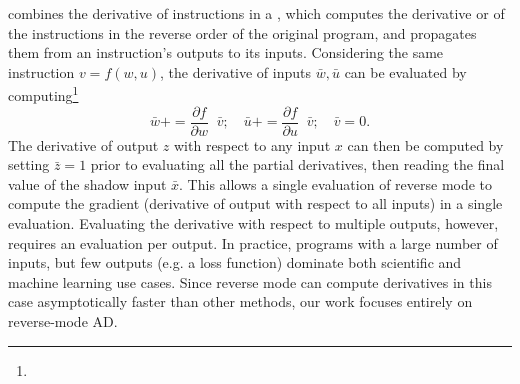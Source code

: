 {%
 combines the derivative of instructions in a , which computes the derivative or  of the instructions in the reverse order of the original program, and propagates them from an instruction's outputs to its inputs. Considering the same instruction $v = f(w,u)$, the derivative of inputs $\bar{w}, \bar{u}$ can be evaluated by computing\footnote{} $$
    \bar{w}+=\frac{\partial f}{\partial w}\;\;\bar{v};\quad{\bar{u}+=\frac{\partial f}{\partial u}\;\;\bar{v};}\quad \bar{v}=0.
$$ The derivative of output $z$ with respect to any input $x$ can then be computed by setting $\bar{z}=1$ prior to evaluating all the partial derivatives, then reading the final value of the shadow input $\bar{x}$. This allows a single evaluation of reverse mode to compute the gradient (derivative of output with respect to all inputs) in a single evaluation. Evaluating the derivative with respect to multiple outputs, however, requires an evaluation per output. %
%
In practice, programs with a large number of inputs, but few outputs (e.g. a loss function) dominate both scientific and machine learning use cases. Since reverse mode can compute derivatives in this case asymptotically faster than other methods, our work focuses entirely on reverse-mode AD.

}

